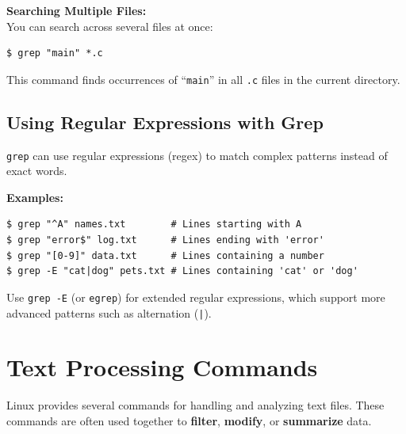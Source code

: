 \textbf{Searching Multiple Files:}\\
You can search across several files at once:
\begin{lstlisting}[language=Terminal]
$ grep "main" *.c
\end{lstlisting}
This command finds occurrences of ``\texttt{main}'' in all \texttt{.c} files in the current directory.

\subsection{Using Regular Expressions with Grep}
\texttt{grep} can use regular expressions (regex) to match complex patterns instead of exact words.

\textbf{Examples:}
\begin{lstlisting}[language=Terminal]
$ grep "^A" names.txt        # Lines starting with A
$ grep "error$" log.txt      # Lines ending with 'error'
$ grep "[0-9]" data.txt      # Lines containing a number
$ grep -E "cat|dog" pets.txt # Lines containing 'cat' or 'dog'
\end{lstlisting}
Use \texttt{grep -E} (or \texttt{egrep}) for extended regular expressions, which support more advanced patterns such as alternation (\texttt{|}).

\section{Text Processing Commands}
Linux provides several commands for handling and analyzing text files. These commands are often used together to \textbf{filter}, \textbf{modify}, or \textbf{summarize} data.

